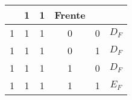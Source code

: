 \begin{table}[!htb]
\begin{tabular}{|ccccc|c|}
                                  & {\color[HTML]{00009B} 1}                                    & {\color[HTML]{00009B} 1}                            
 
       & {\color[HTML]{FE0000} Frente}                                     \\ \hline
{\color[HTML]{00009B} 1}                                     & {\color[HTML]{00009B} 1}                                    & {\color[HTML]{00009B} 1} 
 
                                  & {\color[HTML]{00009B} 0}                                    & {\color[HTML]{00009B} 0}                            
 
       & {\color[HTML]{FE0000} $D_F$}                                     \\ \hline
{\color[HTML]{00009B} 1}                                     & {\color[HTML]{00009B} 1}                                    & {\color[HTML]{00009B} 1} 
 
                                  & {\color[HTML]{00009B} 0}                                    & {\color[HTML]{00009B} 1}                            
 
       & {\color[HTML]{FE0000} $D_F$}                                     \\ \hline
{\color[HTML]{00009B} 1}                                     & {\color[HTML]{00009B} 1}                                    & {\color[HTML]{00009B} 1} 
 
                                  & {\color[HTML]{00009B} 1}                                    & {\color[HTML]{00009B} 0}                            
 
       & {\color[HTML]{FE0000} $D_F$}                                     \\ \hline
{\color[HTML]{00009B} 1}                                     & {\color[HTML]{00009B} 1}                                    & {\color[HTML]{00009B} 1} 
 
                                  & {\color[HTML]{00009B} 1}                                    & {\color[HTML]{00009B} 1}                            
 
       & {\color[HTML]{FE0000} $E_F$}                                    \\ \hline

\end{tabular}
\end{table}

